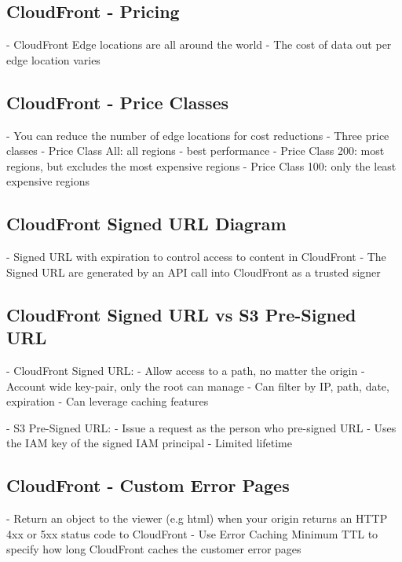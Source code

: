 \documentclass[11pt]{book}
\begin{document}
    \subsection{CloudFront - Pricing}
    - CloudFront Edge locations are all around the world
    - The cost of data out per edge location varies

    \subsection{CloudFront - Price Classes}
    - You can reduce the number of edge locations for cost reductions
    - Three price classes
    - Price Class All: all regions - best performance
    - Price Class 200: most regions, but excludes the most expensive regions
    - Price Class 100: only the least expensive regions


    \subsection{CloudFront Signed URL Diagram}
    - Signed URL with expiration to control access to content in CloudFront
    - The Signed URL are generated by an API call into CloudFront as a trusted signer

    \subsection{CloudFront Signed URL vs S3 Pre-Signed URL}
    - CloudFront Signed URL:
    - Allow access to a path, no matter the origin
    - Account wide key-pair, only the root can manage
    - Can filter by IP, path, date, expiration
    - Can leverage caching features

    - S3 Pre-Signed URL:
    - Issue a request as the person who pre-signed URL
    - Uses the IAM key of the signed IAM principal
    - Limited lifetime


    \subsection{CloudFront - Custom Error Pages}
    - Return an object to the viewer (e.g html) when your origin returns an HTTP 4xx or 5xx status code to CloudFront
    - Use Error Caching Minimum TTL to specify how long CloudFront caches the customer error pages

\end{document}
